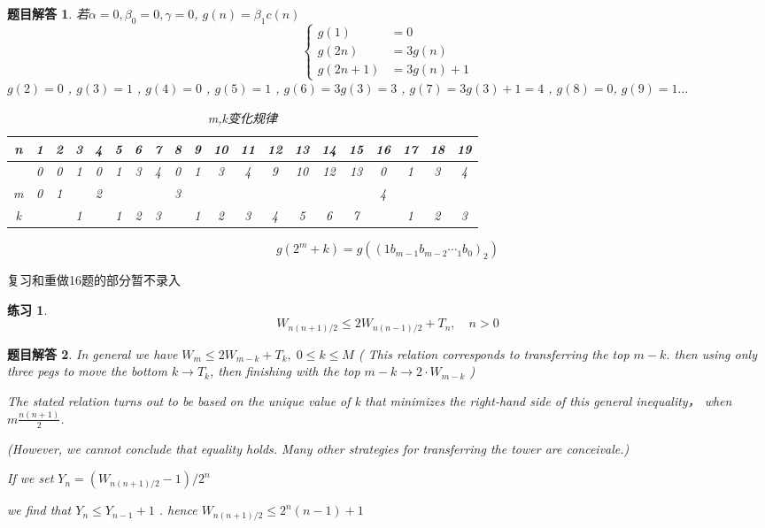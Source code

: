 \documentclass[mode=geye]{elegantnote}
\newtheorem{exercise}{练习}
\newtheorem{answer}{题目解答}
\begin{document}
\begin{answer}
若$ \alpha=0,\beta_0=0, \gamma=0 $, $ g(n)=\beta_1 c(n) $  
\begin{equation*}
	\left\{
		\begin{aligned}
			g(1)&=0\\
			g(2n)&=3g(n)\\
			g(2n+1)&=3g(n)+1
		\end{aligned}
	\right.
\end{equation*}
$ g(2)=0 $ , $ g(3)=1 $ , $ g(4)=0 $ , $ g(5)=1 $ , 
$ g(6)=3g(3)=3 $ , $ g(7)=3g(3)+1=4 $ , $ g(8)=0 $, $ g(9)=1 \dots$  

\begin{table}[htbp]
	\centering
	\small
	\caption{m,k变化规律}
	\begin{tabular}{c|ccccc ccccc ccccc cccc}
		\toprule
		n & 1 & 2 & 3 & 4 & 5 & 6 & 7 & 8 & 9 & 10 & 11 & 12 & 13 & 14 & 15 & 16 & 17 & 18 & 19 \\
		\midrule
		& 0 & 0 & 1 & 0 & 1 & 3 & 4 & 0 & 1 & 3  & 4  & 9  & 10 & 12 & 13 & 0  & 1  & 3  & 4  \\
		m & 0 & 1 &   & 2 &   &   &   & 3 &   &    &    &    &    &    & & 4  &    &    &    \\  
		k& &   & 1 &   & 1 & 2 & 3 &   & 1 & 2  & 3  & 4  & 5  & 6  & 7 &   & 1  & 2  & 3 \\
		\bottomrule
	\end{tabular}%
	\label{tab:EX16}%
\end{table}%
\begin{equation*}
	g(2^{m}+k)=g(\left( 1 b_{m-1}b_{m-2}\dotsb_1b_0 \right)_2)
\end{equation*}
\end{answer}

复习和重做16题的部分暂不录入


\begin{exercise} 
	\begin{equation*}
		W_{n(n+1)/2} \leqslant 2W_{n(n-1)/2}+T_n, \quad n>0
	\end{equation*}
\end{exercise}

\begin{answer}
	In general we have $ W_m\leqslant 2W_{m-k}+T_k, \; 0\leqslant k \leqslant M $ 
( This relation corresponds to transferring the top $ m-k $. 
then using only three pegs to move the bottom $ k\rightarrow T_k $, then finishing with the top $ m-k \rightarrow 2\cdot W_{m-k} $ )

The stated relation turns out to be based on the unique value of k that minimizes the right-hand side of this general inequality， when $ m\frac{n(n+1)}{2} $.

(However, we cannot conclude that equality holds. Many other
strategies for transferring the tower are conceivale.)

If we set $ Y_n = (W_{n(n+1)/2}-1)/2^n $ 

we find that $ Y_n \leqslant Y_{n-1}+1 $ . 
hence $ W_{n(n+1)/2} \leqslant 2^n(n-1)+1 $ 
\end{answer}
\end{document}
